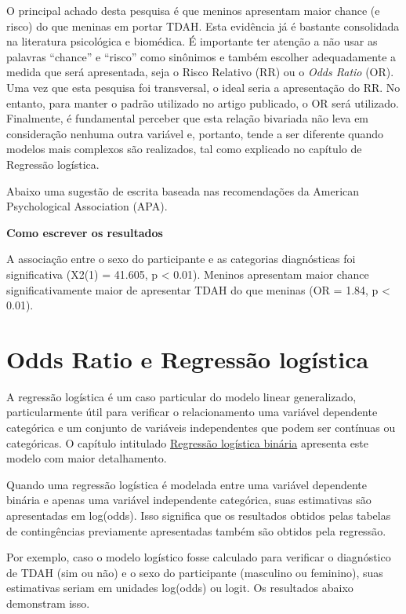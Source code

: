 \documentclass[
]{book}
\begin{document}
O principal achado desta pesquisa é que meninos apresentam maior chance (e risco) do que meninas em portar TDAH. Esta evidência já é bastante consolidada na literatura psicológica e biomédica. É importante ter atenção a não usar as palavras ``chance'' e ``risco'' como sinônimos e também escolher adequadamente a medida que será apresentada, seja o Risco Relativo (RR) ou o \emph{Odds Ratio} (OR). Uma vez que esta pesquisa foi transversal, o ideal seria a apresentação do RR. No entanto, para manter o padrão utilizado no artigo publicado, o OR será utilizado. Finalmente, é fundamental perceber que esta relação bivariada não leva em consideração nenhuma outra variável e, portanto, tende a ser diferente quando modelos mais complexos são realizados, tal como explicado no capítulo de Regressão logística.

Abaixo uma sugestão de escrita baseada nas recomendações da American Psychological Association (APA).

\textbf{Como escrever os resultados}

A associação entre o sexo do participante e as categorias diagnósticas foi significativa (X2(1) = 41.605, p \textless{} 0.01). Meninos apresentam maior chance significativamente maior de apresentar TDAH do que meninas (OR = 1.84, p \textless{} 0.01).

\hypertarget{odds-ratio-e-regressuxe3o-loguxedstica}{%
\section{Odds Ratio e Regressão logística}\label{odds-ratio-e-regressuxe3o-loguxedstica}}

A regressão logística é um caso particular do modelo linear generalizado, particularmente útil para verificar o relacionamento uma variável dependente categórica e um conjunto de variáveis independentes que podem ser contínuas ou categóricas. O capítulo intitulado \protect\hyperlink{17_regressao_logistica_binaria}{Regressão logística binária} apresenta este modelo com maior detalhamento.

Quando uma regressão logística é modelada entre uma variável dependente binária e apenas uma variável independente categórica, suas estimativas são apresentadas em log(odds). Isso significa que os resultados obtidos pelas tabelas de contingências previamente apresentadas também são obtidos pela regressão.

Por exemplo, caso o modelo logístico fosse calculado para verificar o diagnóstico de TDAH (sim ou não) e o sexo do participante (masculino ou feminino), suas estimativas seriam em unidades log(odds) ou logit. Os resultados abaixo demonstram isso.
\end{document}
